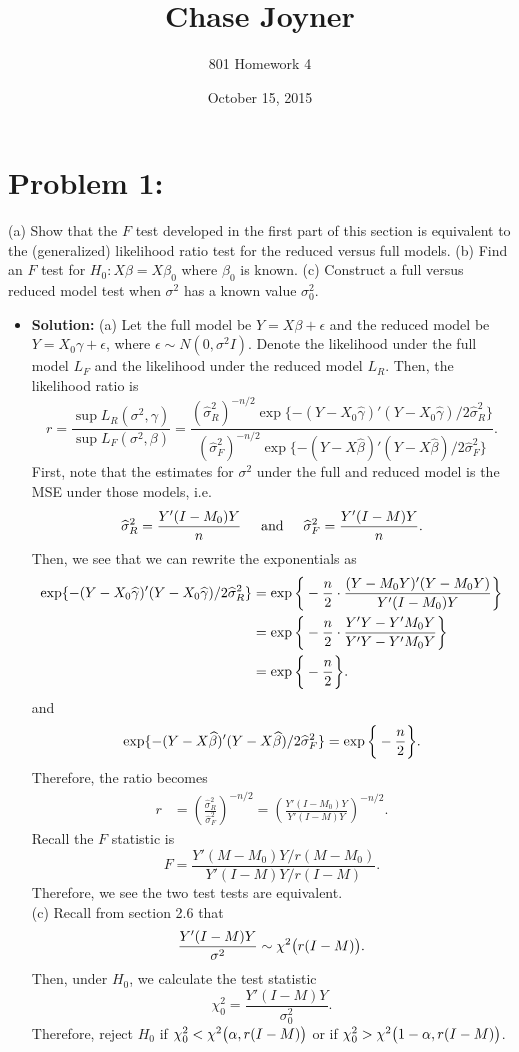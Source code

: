 \documentclass[11pt]{article}
\title{Chase Joyner}
\author{801 Homework 4}
\date{October 15, 2015}
\begin{document}
\maketitle
\section*{Problem 1:}  (a)  Show that the $F$ test developed in the first part of this section is equivalent to the (generalized) likelihood ratio test for the reduced versus full models.  (b)  Find an $F$ test for $H_0\colon X\beta = X\beta_0$ where $\beta_0$ is known.  (c)  Construct a full versus reduced model test when $\sigma^2$ has a known value $\sigma_0^2$.
\begin{itemize}
\item[] {\bf Solution:}  (a)  Let the full model be $Y = X\beta + \epsilon$ and the reduced model be $Y = X_0\gamma + \epsilon$, where $\epsilon \sim N(0,\sigma^2I)$.  Denote the likelihood under the full model $L_F$ and the likelihood under the reduced model $L_R$.  Then, the likelihood ratio is
\[
r = \frac{\sup L_R(\sigma^2,\gamma)}{\sup L_F(\sigma^2,\beta)} = \frac{(\widehat{\sigma}^2_R)^{-n/2}\exp\{-(Y-X_0\widehat{\gamma})'(Y-X_0\widehat{\gamma})/2\widehat{\sigma}^2_R\}}{(\widehat{\sigma}^2_F)^{-n/2}\exp\{-(Y-X\widehat{\beta})'(Y-X\widehat{\beta})/2\widehat{\sigma}^2_F\}}.
\]
First, note that the estimates for $\sigma^2$ under the full and reduced model is the MSE under those models, i.e.
\[
\widehat{\sigma}^2_R = \frac{Y'(I-M_0)Y}{n} \hspace{5mm}\text{and}\hspace{5mm} \widehat{\sigma}^2_F = \frac{Y'(I-M)Y}{n}.
\]
Then, we see that we can rewrite the exponentials as
\begin{align*}
\exp\{-(Y-X_0\widehat{\gamma})'(Y-X_0\widehat{\gamma})/2\widehat{\sigma}^2_R\} &= \exp\bigg{\{}-\frac{n}{2}\cdot\frac{(Y-M_0Y)'(Y-M_0Y)}{Y'(I-M_0)Y} \bigg{\}} \\
&= \exp\bigg{\{}-\frac{n}{2}\cdot\frac{Y'Y - Y'M_0Y}{Y'Y-Y'M_0Y} \bigg{\}} \\
&= \exp\bigg{\{} -\frac{n}{2} \bigg{\}}.
\end{align*}
and
\[
\exp\{-(Y-X\widehat{\beta})'(Y-X\widehat{\beta})/2\widehat{\sigma}^2_F\} = \exp\bigg{\{} -\frac{n}{2}\bigg{\}}.
\]
Therefore, the ratio becomes 
\begin{align*}
r &= \left(\frac{\widehat{\sigma}^2_R}{\widehat{\sigma}^2_F}\right)^{-n/2} = \left( \frac{Y'(I-M_0)Y}{Y'(I-M)Y} \right)^{-n/2}.
\end{align*}
Recall the $F$ statistic is
\[
F = \frac{Y'(M-M_0)Y/r(M-M_0)}{Y'(I-M)Y/r(I-M)}.
\]
Therefore, we see the two test tests are equivalent. \\
(c)  Recall from section 2.6 that
\[
\frac{Y'(I-M)Y}{\sigma^2} \sim \chi^2\big{(}r(I-M)\big{)}.
\]
Then, under $H_0$, we calculate the test statistic
\[
\chi^2_0 = \frac{Y'(I-M)Y}{\sigma_0^2}.
\]
Therefore, reject $H_0$ if $\chi^2_0 < \chi^2\big{(}\alpha, r(I-M)\big{)}$ or if $\chi^2_0 > \chi^2\big{(}1-\alpha, r(I-M)\big{)}$. 
\end{itemize}
\end{document}
